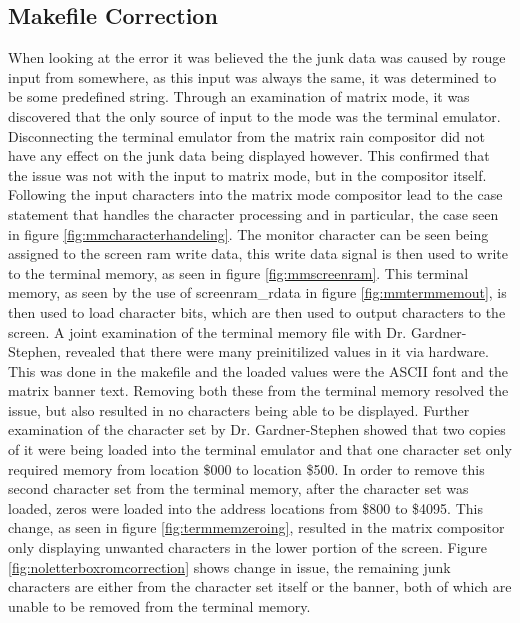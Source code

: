 
\subsection{Makefile Correction}

\label{Ch5 Sec2 Sub1}

When looking at the error it was believed the the junk data was caused by rouge input from somewhere, as this input was always the same, it was determined to be some predefined string. Through an examination of matrix mode, it was discovered that the only source of input to the mode was the terminal emulator. Disconnecting the terminal emulator from the matrix rain compositor did not have any effect on the junk data being displayed however. This confirmed that the issue was not with the input to matrix mode, but in the compositor itself. Following the input characters into the matrix mode compositor lead to the case statement that handles the character processing and in particular, the case seen in figure \ref{fig:mmcharacterhandeling}. The monitor character can be seen being assigned to the screen ram write data, this write data signal is then used to write to the terminal memory, as seen in figure \ref{fig:mmscreenram}. This terminal memory, as seen by the use of screenram\_rdata in figure \ref{fig:mmtermmemout}, is then used to load character bits, which are then used to output characters to the screen. A joint examination of the terminal memory file with Dr. Gardner-Stephen, revealed that there were many preinitilized values in it via hardware. This was done in the makefile and the loaded values were the ASCII font and the matrix banner text. Removing both these from the terminal memory resolved the issue, but also resulted in no characters being able to be displayed. Further examination of the character set by Dr. Gardner-Stephen showed that two copies of it were being loaded into the terminal emulator and that one character set only required memory from location \$000 to location \$500. In order to remove this second character set from the terminal memory, after the character set was loaded, zeros were loaded into the address locations from \$800 to \$4095. This change, as seen in figure \ref{fig:termmemzeroing}, resulted in the matrix compositor only displaying unwanted characters in the lower portion of the screen. Figure \ref{fig:noletterboxromcorrection} shows change in issue, the remaining junk characters are either from the character set itself or the banner, both of which are unable to be removed from the terminal memory.

